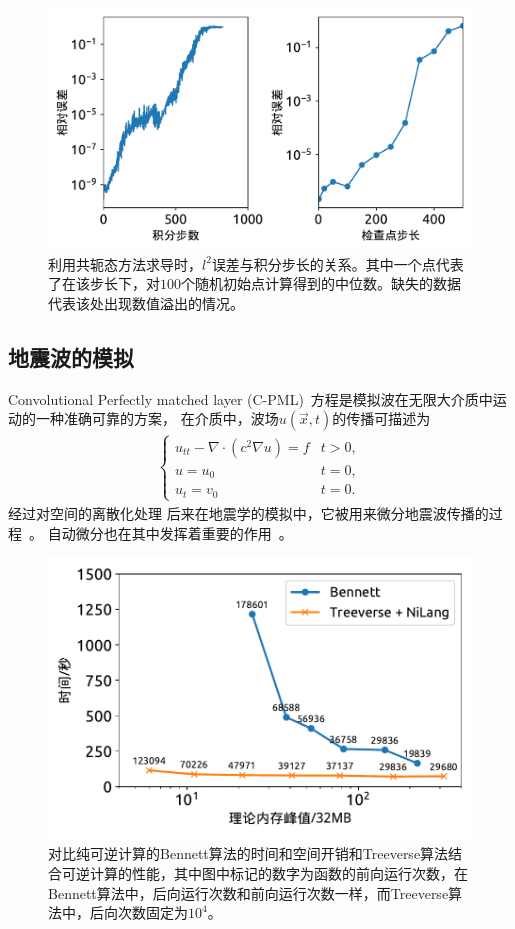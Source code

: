 \documentclass[A4,twoside,fontset=ubuntu,UTF8]{ctexart}
\begin{document}
\begin{figure}[t]
\centering
\includegraphics[width=0.6\columnwidth]{./fig2.pdf}
    \caption{利用共轭态方法求导时，$l^2$误差与积分步长的关系。其中一个点代表了在该步长下，对$100$个随机初始点计算得到的中位数。缺失的数据代表该处出现数值溢出的情况。\label{fig:neuralode-error}} 
\end{figure}


\baselineskip
\subsection{地震波的模拟}
Convolutional Perfectly matched layer (C-PML)~\cite{Roden2000,MaKoEz08}方程是模拟波在无限大介质中运动的一种准确可靠的方案，
在介质中，波场$u(\vec x, t)$的传播可描述为
\begin{align}
    \begin{cases}
    u_{tt} - \nabla\cdot(c^2\nabla u) = f & t>0,\\
    u = u_0 & t=0,\\
    u_t = v_0 & t=0.
    \end{cases}
\end{align}
经过对空间的离散化处理
后来在地震学的模拟中，它被用来微分地震波传播的过程~\cite{Symes2007}。
自动微分也在其中发挥着重要的作用~\cite{Zhu2020}。
~\cite{Grote2010}

\begin{figure}[t]
\centering
\includegraphics[width=0.6\columnwidth]{./fig5.pdf}
    \caption{对比纯可逆计算的Bennett算法的时间和空间开销和Treeverse算法结合可逆计算的性能，其中图中标记的数字为函数的前向运行次数，在Bennett算法中，后向运行次数和前向运行次数一样，而Treeverse算法中，后向次数固定为$10^4$。\label{fig:seismic}} 
\end{figure}
\end{document}

